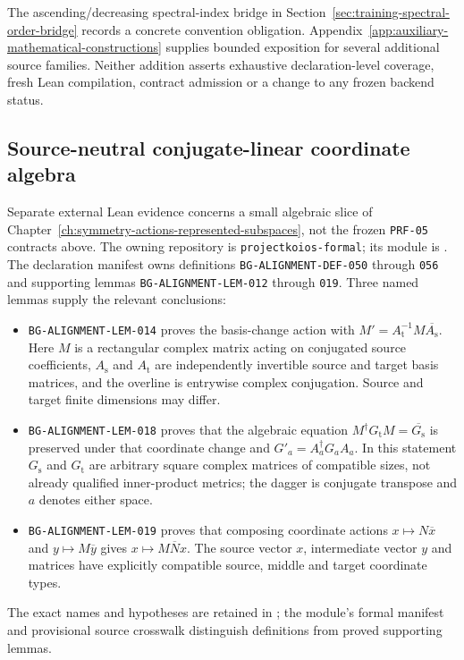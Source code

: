 The ascending/decreasing spectral-index bridge in
Section~\ref{sec:training-spectral-order-bridge} records a concrete convention
obligation. Appendix~\ref{app:auxiliary-mathematical-constructions} supplies
bounded exposition for several additional source families. Neither addition
asserts exhaustive declaration-level coverage, fresh Lean compilation,
contract admission or a change to any frozen backend status.

\subsection{Source-neutral conjugate-linear coordinate algebra}
\label{sec:mechanization-conjugate-linear-coordinate-algebra}

Separate external Lean evidence concerns a small algebraic slice of
Chapter~\ref{ch:symmetry-actions-represented-subspaces}, not the frozen
\texttt{PRF-05} contracts above. The owning repository is
\texttt{projectkoios-formal}; its module is
.
The declaration manifest owns definitions \texttt{BG-ALIGNMENT-DEF-050}
through \texttt{056} and supporting lemmas \texttt{BG-ALIGNMENT-LEM-012}
through \texttt{019}. Three named lemmas supply the relevant conclusions:
\begin{itemize}
  \item \texttt{BG-ALIGNMENT-LEM-014} proves the basis-change action
    with $M'=A_{\mathrm t}^{-1}M\overline{A_{\mathrm s}}$. Here $M$ is a
    rectangular complex matrix acting on conjugated source coefficients,
    $A_{\mathrm s}$ and $A_{\mathrm t}$ are independently invertible source
    and target basis matrices, and the overline is entrywise complex
    conjugation. Source and target finite dimensions may differ.
  \item \texttt{BG-ALIGNMENT-LEM-018} proves that the algebraic equation
    $M^{\dagger}G_{\mathrm t}M=\overline{G_{\mathrm s}}$ is preserved under
    that coordinate change and $G'_a=A_a^{\dagger}G_aA_a$. In this statement
    $G_{\mathrm s}$ and $G_{\mathrm t}$ are arbitrary square complex
    matrices of compatible sizes, not already qualified inner-product metrics;
    the dagger is conjugate transpose and $a$ denotes either space.
  \item \texttt{BG-ALIGNMENT-LEM-019} proves that composing coordinate
    actions $x\mapsto N\overline x$ and $y\mapsto M\overline y$ gives
    $x\mapsto M\overline N x$. The source vector $x$, intermediate vector
    $y$ and matrices have explicitly compatible source, middle and target
    coordinate types.
\end{itemize}
The exact names and hypotheses are retained in
; the module's formal manifest and provisional
source crosswalk distinguish definitions from proved supporting lemmas.

